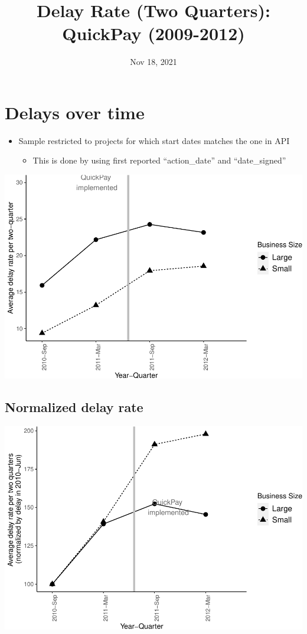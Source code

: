 \documentclass[
]{article}
\title{Delay Rate (Two Quarters): QuickPay (2009-2012)}
\author{}
\date{\vspace{-2.5em}Nov 18, 2021}
\providecommand{\tightlist}{%
  \setlength{\itemsep}{0pt}\setlength{\parskip}{0pt}}
\begin{document}
\maketitle

\hypertarget{delays-over-time}{%
\section{Delays over time}\label{delays-over-time}}

\begin{itemize}
\tightlist
\item
  Sample restricted to projects for which start dates matches the one in
  API

  \begin{itemize}
  \tightlist
  \item
    This is done by using first reported ``action\_date'' and
    ``date\_signed''
  \end{itemize}
\end{itemize}

\includegraphics{qp_first_delay_two_quarters_files/figure-latex/plot_pc_delay-1.pdf}

\hypertarget{normalized-delay-rate}{%
\subsection{Normalized delay rate}\label{normalized-delay-rate}}

\includegraphics{qp_first_delay_two_quarters_files/figure-latex/normalized_plot-1.pdf}
\end{document}
